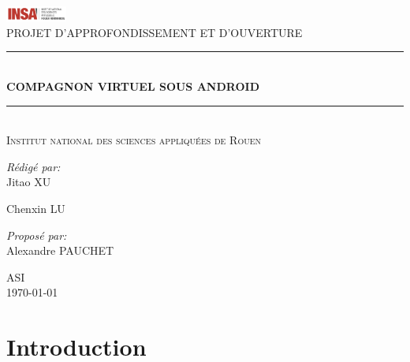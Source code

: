 \documentclass[pdftex, a4paper,12pt]{report}
\newcommand{\HRule}{\rule{\linewidth}{0.5mm}}
\begin{document}
 

\begin{titlepage}

\begin{center}

\includegraphics[width=0.15\textwidth]{./logo_INSA_RN}\\[1cm]    

\textsc{\Large PROJET D'APPROFONDISSEMENT ET D'OUVERTURE}\\[0.5cm]

\HRule \\[0.8cm]
{\LARGE \bfseries COMPAGNON VIRTUEL SOUS ANDROID}\\[0.4cm]

\HRule \\[1.5cm]

\textsc{Institut national des sciences appliquées de Rouen}\\[1.5cm]

\begin{minipage}{0.4\textwidth}
\begin{flushleft} \large
\emph{Rédigé par:}\\
Jitao \textsc{XU}

Chenxin \textsc{LU}
\end{flushleft}
\end{minipage}
\begin{minipage}{0.4\textwidth}
\begin{flushright} \large
\emph{Proposé par:} \\
Alexandre \textsc{PAUCHET}
\end{flushright}
\end{minipage}

\vfill

\textsc{\large ASI}\\
{\large \today}

\end{center}
\end{titlepage}


\section*{Introduction}
\end{document}
